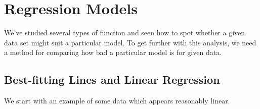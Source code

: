 \graphicspath{{5regression/asy/}}

\section{Regression Models}

We've studied several types of function and seen how to spot whether a given data set might suit a particular model. To get further with this analysis, we need a method for comparing how bad a particular model is for given data.

\subsection{Best-fitting Lines and Linear Regression}\label{sec:reg1}

We start with an example of some data which appears reasonably linear.

